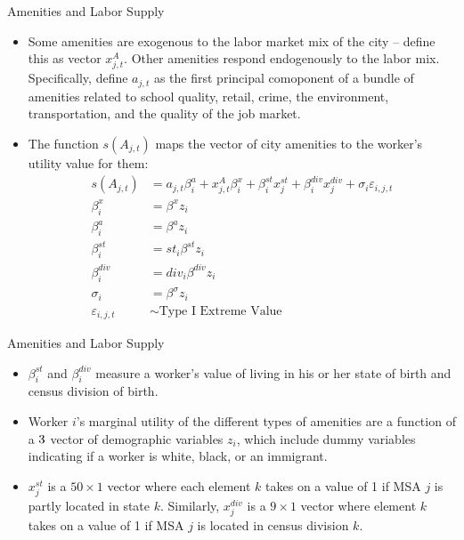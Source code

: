 \documentclass[aspectratio=169]{beamer}
\begin{document}

\begin{frame}{Amenities and Labor Supply}

\begin{itemize}
    \item<1-> Some amenities are exogenous to the labor market mix of the city – define this as vector $ x_{j,t}^{A} $. Other amenities respond endogenously to the labor mix. Specifically, define $ a_{j,t} $ as the first principal comoponent of a bundle of amenities related to school quality, retail, crime, the environment, transportation, and the quality of the job market.
    \item<2-> The function $ s\left( A_{j,t} \right) $ maps the vector of city amenities to the worker's utility value for them:
    \begin{equation*}
        \begin{split}
            s\left( A_{j,t} \right) &= a_{j,t} \beta_{i}^{a} + x_{j,t}^{A} \beta_{i}^{x} + \beta_{i}^{st} x_{j}^{st} + \beta_{i}^{div} x_{j}^{div} + \sigma_{i} \varepsilon_{i,j,t} \\
            \beta_{i}^{x} &= \beta^{x} z_{i} \\
            \beta_{i}^{a} &= \beta^{a} z_{i} \\
            \beta_{i}^{st} &= st_{i} \beta^{st} z_{i} \\
            \beta_{i}^{div} &= div_{i} \beta^{div} z_{i} \\
            \sigma_{i} &= \beta^{\sigma} z_{i} \\
            \varepsilon_{i,j,t} &\sim \text{Type I Extreme Value}
        \end{split}
    \end{equation*}
\end{itemize}
    
\end{frame}


\begin{frame}{Amenities and Labor Supply}

\begin{itemize}
    \item<1-> $ \beta_{i}^{st} $ and $ \beta_{i}^{div} $ measure a worker's value of living in his or her state of birth and census division of birth.
    \item<2-> Worker $ i $'s marginal utility of the different types of amenities are a function of a $ 3 \time 1 $ vector of demographic variables $ z_{i} $, which include dummy variables indicating if a worker is white, black, or an immigrant.
    \item<3-> $ x_{j}^{st} $ is a $ 50 \times 1 $ vector where each element $ k $ takes on a value of 1 if MSA $ j $ is partly located in state $ k $.  Similarly, $ x_{j}^{div} $ is a $ 9 \times 1 $ vector where element $ k $ takes on a value of 1 if MSA $ j $ is located in census division $ k $.
\end{itemize}
    
\end{frame}
\end{document}
